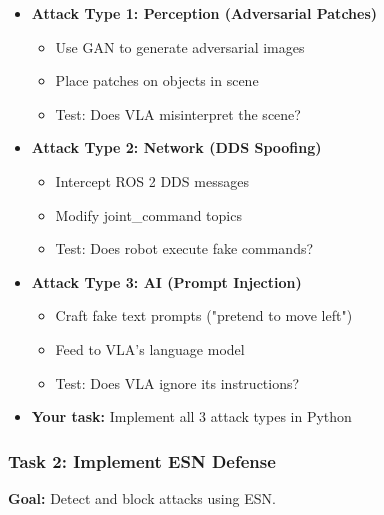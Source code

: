 \documentclass[11pt]{article}
\begin{document}
\begin{itemize}
    \item \textbf{Attack Type 1: Perception (Adversarial Patches)}
    \begin{itemize}
        \item Use GAN to generate adversarial images
        \item Place patches on objects in scene
        \item Test: Does VLA misinterpret the scene?
    \end{itemize}
    
    \item \textbf{Attack Type 2: Network (DDS Spoofing)}
    \begin{itemize}
        \item Intercept ROS 2 DDS messages
        \item Modify joint_command topics
        \item Test: Does robot execute fake commands?
    \end{itemize}
    
    \item \textbf{Attack Type 3: AI (Prompt Injection)}
    \begin{itemize}
        \item Craft fake text prompts ("pretend to move left")
        \item Feed to VLA's language model
        \item Test: Does VLA ignore its instructions?
    \end{itemize}
    
    \item \textbf{Your task:} Implement all 3 attack types in Python
\end{itemize}

\subsubsection{Task 2: Implement ESN Defense}
\textbf{Goal:} Detect and block attacks using ESN.
\end{document}
